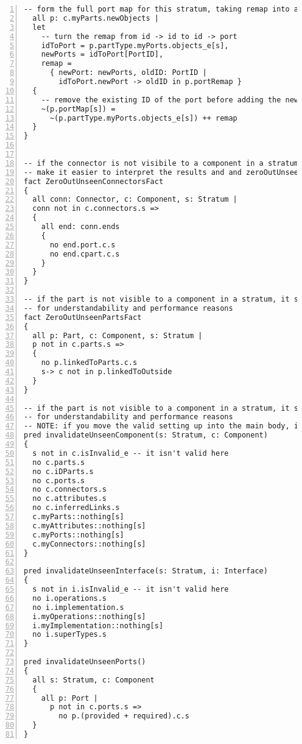 \begin{lstlisting}[caption={facts.als}, numbers=left]
  -- form the full port map for this stratum, taking remap into account
  all p: c.myParts.newObjects |
  let
    -- turn the remap from id -> id to id -> port
    idToPort = p.partType.myPorts.objects_e[s],
    newPorts = idToPort[PortID],
    remap =
      { newPort: newPorts, oldID: PortID |
        idToPort.newPort -> oldID in p.portRemap }
  {
    -- remove the existing ID of the port before adding the new one
    ~(p.portMap[s]) =
      ~(p.partType.myPorts.objects_e[s]) ++ remap
  }
}


-- if the connector is not visibile to a component in a stratum, it should be zeroed out to
-- make it easier to interpret the results and and zeroOutUnseenElement[s, e] cut back on the state space for performance reasons
fact ZeroOutUnseenConnectorsFact
{
  all conn: Connector, c: Component, s: Stratum |
  conn not in c.connectors.s =>
  {
    all end: conn.ends
    {
      no end.port.c.s
      no end.cpart.c.s
    }
  }
}

-- if the part is not visible to a component in a stratum, it should also be zeroed out
-- for understandability and performance reasons
fact ZeroOutUnseenPartsFact
{
  all p: Part, c: Component, s: Stratum |
  p not in c.parts.s =>
  {
    no p.linkedToParts.c.s
    s-> c not in p.linkedToOutside
  }
}

-- if the part is not visible to a component in a stratum, it should also be zeroed out
-- for understandability and performance reasons
-- NOTE: if you move the valid setting up into the main body, it gets slow for some bizarre reason
pred invalidateUnseenComponent(s: Stratum, c: Component)
{
  s not in c.isInvalid_e -- it isn't valid here
  no c.parts.s
  no c.iDParts.s
  no c.ports.s
  no c.connectors.s
  no c.attributes.s
  no c.inferredLinks.s
  c.myParts::nothing[s]
  c.myAttributes::nothing[s]
  c.myPorts::nothing[s]
  c.myConnectors::nothing[s]
}

pred invalidateUnseenInterface(s: Stratum, i: Interface)
{
  s not in i.isInvalid_e -- it isn't valid here
  no i.operations.s
  no i.implementation.s
  i.myOperations::nothing[s]
  i.myImplementation::nothing[s]
  no i.superTypes.s
}

pred invalidateUnseenPorts()
{
  all s: Stratum, c: Component
  {
    all p: Port |
      p not in c.ports.s =>
        no p.(provided + required).c.s
  }
}
\end{lstlisting}